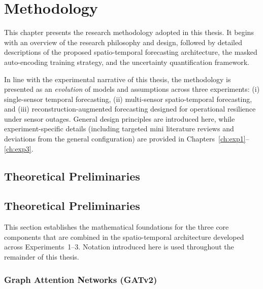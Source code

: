 
\chapter{Methodology}
\label{ch:methodology}

This chapter presents the research methodology adopted in this thesis. It begins with an overview of the research philosophy and design, followed by detailed descriptions of the proposed spatio-temporal forecasting architecture, the masked auto-encoding training strategy, and the uncertainty quantification framework.

In line with the experimental narrative of this thesis, the methodology is presented as an \emph{evolution} of models and assumptions across three experiments: (i) single-sensor temporal forecasting, (ii) multi-sensor spatio-temporal forecasting, and (iii) reconstruction-augmented forecasting designed for operational resilience under sensor outages. General design principles are introduced here, while experiment-specific details (including targeted mini literature reviews and deviations from the general configuration) are provided in Chapters~\ref{ch:exp1}--\ref{ch:exp3}.

\section{Theoretical Preliminaries}
\section{Theoretical Preliminaries}
\label{sec:meth-prelims}

This section establishes the mathematical foundations for the three core components that are combined in the spatio-temporal architecture developed across Experiments~1--3. Notation introduced here is used throughout the remainder of this thesis.

\subsection{Graph Attention Networks (GATv2)}
\label{subsec:meth-gatv2}


